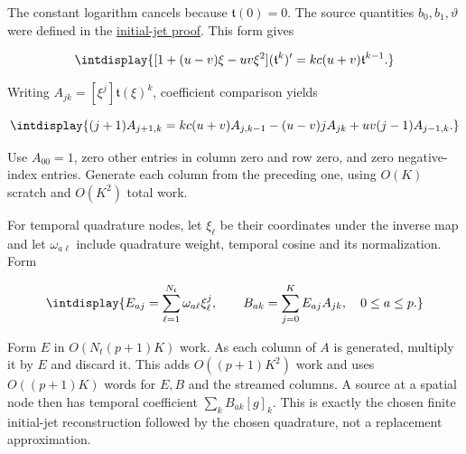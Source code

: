 The constant logarithm cancels because \(\mathfrak t(0)=0\). The source quantities \(b_0,\allowbreak b_1,\allowbreak \vartheta\) were defined in the \hyperref[int:harmonic-initial-jet-proof]{initial-jet proof}. This form gives


\begingroup\renewcommand{\theHequation}{intdisplay.831}
\begin{equation*}
\intdisplay{
[1+(u-v)\xi-uv\xi^2](\mathfrak t^k)'
 =kc(u+v)\mathfrak t^{k-1}.
}
\end{equation*}
\endgroup


Writing \(A_{jk}=[\xi^j]\mathfrak t(\xi)^k\), coefficient comparison yields


\begingroup\renewcommand{\theHequation}{intdisplay.832}
\begin{equation}
\intdisplay{
(j+1)A_{j+1,k}
 =kc(u+v)A_{j,k-1}-(u-v)jA_{jk}
   +uv(j-1)A_{j-1,k}.
}
\label{int:eq-0407-cost-continuation-power-recurrence}
\end{equation}
\endgroup


Use \(A_{00}=1\), zero other entries in column zero and row zero, and zero negative-index entries. Generate each column from the preceding one, using \(O(K)\) scratch and \(O(K^2)\) total work.



For temporal quadrature nodes, let \(\xi_\ell\) be their coordinates under the inverse map and let \(\omega_{a\ell}\) include quadrature weight, temporal cosine and its normalization. Form


\begingroup\renewcommand{\theHequation}{intdisplay.833}
\begin{equation}
\intdisplay{
E_{aj}=\sum_{\ell=1}^{N_t}\omega_{a\ell}\xi_\ell^j,\qquad
B_{ak}=\sum_{j=0}^KE_{aj}A_{jk},
\quad 0\le a\le p.
}
\label{int:eq-0408-cost-compiled-temporal-map}
\end{equation}
\endgroup


Form \(E\) in \(O(N_t(p+1)K)\) work. As each column of \(A\) is generated, multiply it by \(E\) and discard it. This adds \(O((p+1)K^2)\) work and uses \(O((p+1)K)\) words for \(E,\allowbreak B\) and the streamed columns. A source at a spatial node then has temporal coefficient \(\sum_k B_{ak}[g]_k\). This is exactly the chosen finite initial-jet reconstruction followed by the chosen quadrature, not a replacement approximation.


